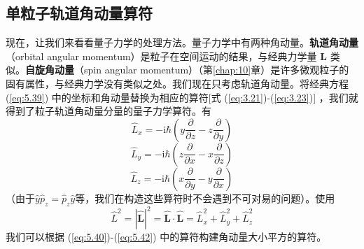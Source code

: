 \subsection*{单粒子轨道角动量算符}
    现在，让我们来看看量子力学的处理方法。量子力学中有两种角动量。\textbf{轨道角动量}（orbital angular momentum）是粒子在空间运动的结果，与经典力学量 $\mathbf{L}$ 类似。\textbf{自旋角动量}（spin angular momentum）（第\ref{chap:10}章）是许多微观粒子的固有属性，与经典力学没有类似之处。我们现在只考虑轨道角动量。将经典方程(\ref{eq:5.39}) 中的坐标和角动量替换为相应的算符[式 (\ref{eq:3.21})-(\ref{eq:3.23})] ，我们就得到了粒子轨道角动量分量的量子力学算符。有
    \begin{equation}
        \hat{L}_x = -\mathrm{i}\hbar\left(y\frac{\partial}{\partial z} - z\frac{\partial}{\partial y}\right)
        \label{eq:5.40}
    \end{equation}
    \begin{equation}
        \hat{L}_y = -\mathrm{i}\hbar\left(z\frac{\partial}{\partial x} - x\frac{\partial}{\partial z}\right)
        \label{eq:5.41}
    \end{equation}
    \begin{equation}
        \hat{L}_z = -\mathrm{i}\hbar\left(x\frac{\partial}{\partial y} - y\frac{\partial}{\partial x}\right)
        \label{eq:5.42}
    \end{equation}
    （由于$\hat{y}\hat{p}_z = \hat{p}_z\hat{y}$等，我们在构造这些算符时不会遇到不可对易的问题）。使用
    \begin{equation}
        \hat{L}^2 = \left|\hat{\mathbf{L}}\right|^2 = \hat{\mathbf{L}}\cdot\hat{\mathbf{L}} = \hat{L}_x^2 + \hat{L}_y^2 + \hat{L}_z^2
        \label{eq:5.43}
    \end{equation}
    我们可以根据 (\ref{eq:5.40})-(\ref{eq:5.42}) 中的算符构建角动量大小平方的算符。

